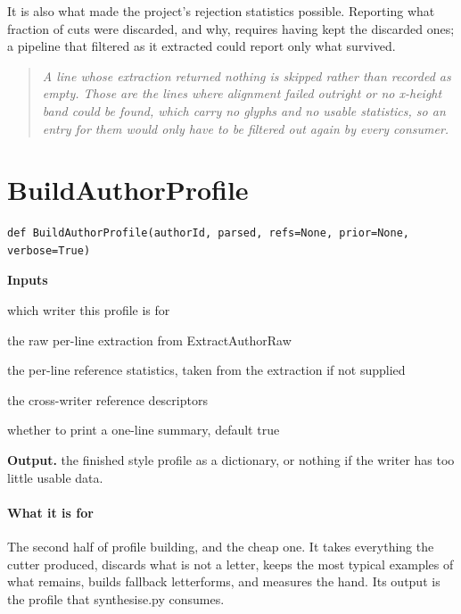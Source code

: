It is also what made the project's rejection statistics possible. Reporting what fraction of cuts were discarded, and why, requires having kept the discarded ones; a pipeline that filtered as it extracted could report only what survived.


\begin{quote}\small\itshape A line whose extraction returned nothing is skipped rather than recorded as empty. Those are the lines where alignment failed outright or no x-height band could be found, which carry no glyphs and no usable statistics, so an entry for them would only have to be filtered out again by every consumer.\end{quote}

\section{BuildAuthorProfile}
\begin{lstlisting}[style=sig]
def BuildAuthorProfile(authorId, parsed, refs=None, prior=None, verbose=True)
\end{lstlisting}

\noindent\textbf{Inputs}
\begin{description}[leftmargin=2.2em,style=nextline,font=\normalfont\ttfamily]\setlength\itemsep{1pt}
  \item[{authorId}] \normalfont which writer this profile is for
  \item[{parsed}] \normalfont the raw per-line extraction from ExtractAuthorRaw
  \item[{refs}] \normalfont the per-line reference statistics, taken from the extraction if not supplied
  \item[{prior}] \normalfont the cross-writer reference descriptors
  \item[{verbose}] \normalfont whether to print a one-line summary, default true
\end{description}

\noindent\textbf{Output.} the finished style profile as a dictionary, or nothing if the writer has too little usable data.


\paragraph{What it is for}
The second half of profile building, and the cheap one. It takes everything the cutter produced, discards what is not a letter, keeps the most typical examples of what remains, builds fallback letterforms, and measures the hand. Its output is the profile that synthesise.py consumes.


